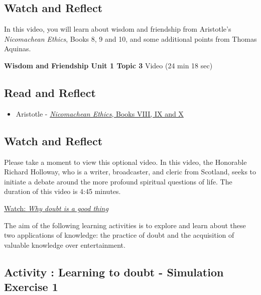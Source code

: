 \documentclass[
]{book}
\providecommand{\tightlist}{%
  \setlength{\itemsep}{0pt}\setlength{\parskip}{0pt}}
\begin{document}
\hypertarget{watch-and-reflect-4}{%
\subsection*{Watch and Reflect}\label{watch-and-reflect-4}}

In this video, you will learn about wisdom and friendship from Aristotle's \emph{Nicomachean Ethics}, Books 8, 9 and 10, and some additional points from Thomas Aquinas.

\textbf{Wisdom and Friendship Unit 1 Topic 3} Video (24 min 18 sec)

\hypertarget{read-and-reflect-2}{%
\subsection*{Read and Reflect}\label{read-and-reflect-2}}

\begin{itemize}
\tightlist
\item
  Aristotle - \href{assets/u1/PHIL-100-Aristotle-NE-VIII-IX-X.pdf}{\emph{Nicomachean Ethics}, Books VIII, IX and X}
\end{itemize}

\hypertarget{watch-and-reflect-5}{%
\subsection*{Watch and Reflect}\label{watch-and-reflect-5}}

\begin{reflect}
Please take a moment to view this optional video. In this video, the Honorable Richard Holloway, who is a writer, broadcaster, and cleric from Scotland, seeks to initiate a debate around the more profound spiritual questions of life. The duration of this video is 4:45 minutes.

\href{https://www.youtube.com/watch?v=LERi_Xjfio4}{Watch: \emph{Why doubt is a good thing}}
\end{reflect}

The aim of the following learning activities is to explore and learn about these two applications of knowledge: the practice of doubt and the acquisition of valuable knowledge over entertainment.

\hypertarget{activity-learning-to-doubt---simulation-exercise-1}{%
\subsection*{Activity : Learning to doubt - Simulation Exercise 1}\label{activity-learning-to-doubt---simulation-exercise-1}}
\end{document}
